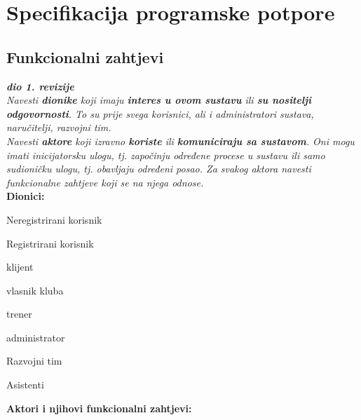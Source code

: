 \chapter{Specifikacija programske potpore}
		
	\section{Funkcionalni zahtjevi}
			
			\textbf{\textit{dio 1. revizije}}\\
			
			\textit{Navesti \textbf{dionike} koji imaju \textbf{interes u ovom sustavu} ili  \textbf{su nositelji odgovornosti}. To su prije svega korisnici, ali i administratori sustava, naručitelji, razvojni tim.}\\
				
			\textit{Navesti \textbf{aktore} koji izravno \textbf{koriste} ili \textbf{komuniciraju sa sustavom}. Oni mogu imati inicijatorsku ulogu, tj. započinju određene procese u sustavu ili samo sudioničku ulogu, tj. obavljaju određeni posao. Za svakog aktora navesti funkcionalne zahtjeve koji se na njega odnose.}\\
			
			
			\noindent \textbf{Dionici:}
			
	\begin{packed_enum}
				\item  Neregistrirani korisnik
				\item  Registrirani korisnik 
					\begin{packed_enum}
						
						\item  klijent
						\item  vlasnik kluba
						\item  trener
						\item administrator
				
					\end{packed_enum}

				\item Razvojni tim
				\item Asistenti
										
			\end{packed_enum}
			
			\noindent \textbf{Aktori i njihovi funkcionalni zahtjevi:}
			
